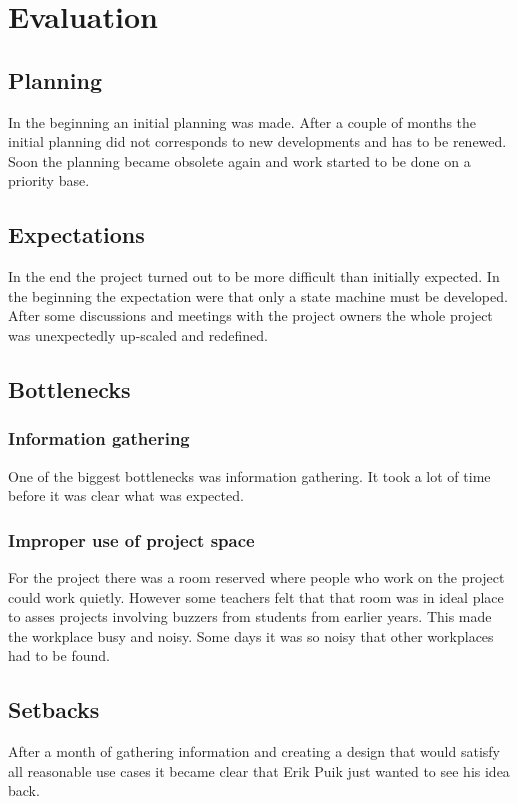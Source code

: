 \documentclass[12pt,a4paper]{report}
\begin{document}
\newpage
\section{Evaluation}
\subsection{Planning}
In the beginning an initial planning was made. 
After a couple of months the initial planning did not corresponds to new developments and has to be renewed.
Soon the planning became obsolete again and work started to be done on a priority base.

\subsection{Expectations}
In the end the project turned out to be more difficult than initially expected.
In the beginning the expectation were that only a state machine must be developed.
After some discussions and meetings with the project owners the whole project was unexpectedly up-scaled and redefined.

\subsection{Bottlenecks}
\subsubsection{Information gathering}
One of the biggest bottlenecks was information gathering.
It took a lot of time before it was clear what was expected.

\subsubsection{Improper use of project space}
For the project there was a room reserved where people who work on the project could work quietly.
However some teachers felt that that room was in ideal place to asses projects involving buzzers from students from earlier years.
This made the workplace busy and noisy.
Some days it was so noisy that other workplaces had to be found.

\subsection{Setbacks}
After a month of gathering information and creating a design that would satisfy all reasonable use cases it became clear that Erik Puik just wanted to see his idea back.
\end{document}
